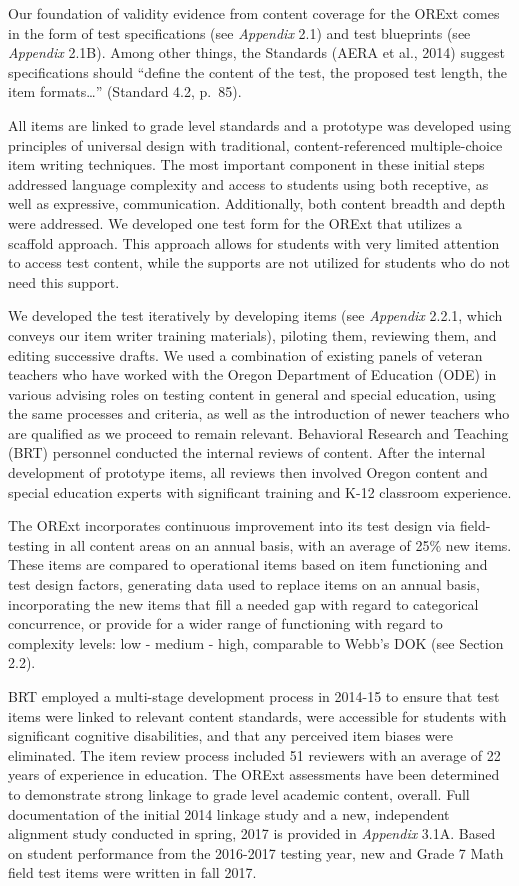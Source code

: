 \documentclass[]{article}
\begin{document}
Our foundation of validity evidence from content coverage for the ORExt
comes in the form of test specifications (see \emph{Appendix} 2.1) and
test blueprints (see \emph{Appendix} 2.1B). Among other things, the
Standards (AERA et al., 2014) suggest specifications should ``define the
content of the test, the proposed test length, the item
formats\ldots{}'' (Standard 4.2, p.~85).

All items are linked to grade level standards and a prototype was
developed using principles of universal design with traditional,
content-referenced multiple-choice item writing techniques. The most
important component in these initial steps addressed language complexity
and access to students using both receptive, as well as expressive,
communication. Additionally, both content breadth and depth were
addressed. We developed one test form for the ORExt that utilizes a
scaffold approach. This approach allows for students with very limited
attention to access test content, while the supports are not utilized
for students who do not need this support.

We developed the test iteratively by developing items (see
\emph{Appendix} 2.2.1, which conveys our item writer training
materials), piloting them, reviewing them, and editing successive
drafts. We used a combination of existing panels of veteran teachers who
have worked with the Oregon Department of Education (ODE) in various
advising roles on testing content in general and special education,
using the same processes and criteria, as well as the introduction of
newer teachers who are qualified as we proceed to remain relevant.
Behavioral Research and Teaching (BRT) personnel conducted the internal
reviews of content. After the internal development of prototype items,
all reviews then involved Oregon content and special education experts
with significant training and K-12 classroom experience.

The ORExt incorporates continuous improvement into its test design via
field-testing in all content areas on an annual basis, with an average
of 25\% new items. These items are compared to operational items based
on item functioning and test design factors, generating data used to
replace items on an annual basis, incorporating the new items that fill
a needed gap with regard to categorical concurrence, or provide for a
wider range of functioning with regard to complexity levels: low -
medium - high, comparable to Webb's DOK (see Section 2.2).

BRT employed a multi-stage development process in 2014-15 to ensure that
test items were linked to relevant content standards, were accessible
for students with significant cognitive disabilities, and that any
perceived item biases were eliminated. The item review process included
51 reviewers with an average of 22 years of experience in education. The
ORExt assessments have been determined to demonstrate strong linkage to
grade level academic content, overall. Full documentation of the initial
2014 linkage study and a new, independent alignment study conducted in
spring, 2017 is provided in \emph{Appendix} 3.1A. Based on student
performance from the 2016-2017 testing year, new and Grade 7 Math field
test items were written in fall 2017.
\end{document}
